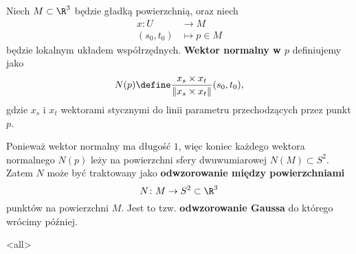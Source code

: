 \begin{frame}[<+->]

\begin{definicja}\label{def:normal-vector}
 Niech $M\subset \R^3$ będzie gładką powierzchnią, oraz niech 
\begin{align*}
x\colon U&\longrightarrow M \\
(s_0,t_0)&\longmapsto p\in M
\end{align*}
będzie lokalnym układem współrzędnych. \textbf{Wektor normalny w $p$} definiujemy jako
\[N(p)\define\frac{x_s\times x_t}{\|x_s\times x_t\|}(s_0,t_0),\]
gdzie $x_s$ i $x_t$ wektorami stycznymi do linii parametru przechodzących przez punkt $p$.
\end{definicja}

\end{frame}
\begin{frame}[<+->]

\begin{uwaga}
Ponieważ wektor normalny ma długość $1$, więc koniec każdego wektora normalnego $N(p)$ leży na powierzchni sfery dwuwumiarowej $N(M)\subset S^2$. Zatem $N$ może być traktowany jako \textbf{odwzorowanie między powierzchniami}\[N\colon M\to S^2\subset\R^3\] punktów na powierzchni $M$. Jest to tzw. \textbf{odwzorowanie Gaussa} do którego wrócimy później.
\end{uwaga}

\end{frame}
\mode<all>{}


